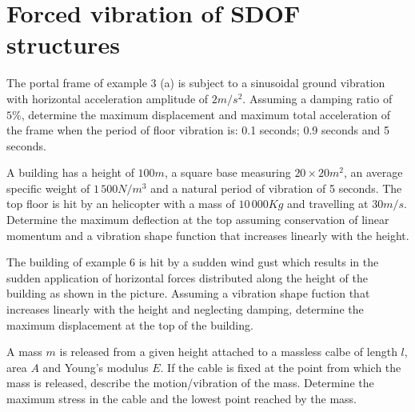 \documentclass{problems}
\begin{document}
\begin{center}
\end{center}



\section{Forced vibration of SDOF structures}


 The portal frame of example 3 (a) is subject to a sinusoidal ground vibration with horizontal acceleration amplitude of $2m/s^2$. Assuming a damping ratio of $5\%$, determine the maximum displacement and maximum total acceleration of the frame when the period of floor vibration is: 0.1 seconds; 0.9 seconds and 5 seconds.

\begin{center}
\end{center}


 A building has a height of $100m$, a square base measuring $20\times20m^2$, an average specific weight of $1\,500N/m^3$ and a natural period of vibration of 5 seconds. The top floor is hit by an helicopter with a mass of $10\,000Kg$ and travelling at $30m/s$. Determine the maximum deflection at the top assuming conservation of linear momentum and a vibration shape function that increases linearly with the height.

\begin{center}
\end{center}


 The building of example 6 is hit by a sudden wind gust which results in the sudden application of horizontal forces distributed along the height of the building as shown in the picture. Assuming a vibration shape fuction that increases linearly with the height and neglecting damping, determine the maximum displacement at the top of the building.

\begin{center}
\end{center}


 A mass $m$ is released from a given height attached to a massless calbe of length $l$, area $A$ and Young's modulus $E$. If the cable is fixed at the point from which the mass is released, describe the motion/vibration of the mass. Determine the maximum stress in the cable and the lowest point reached by the mass.
\end{document}
